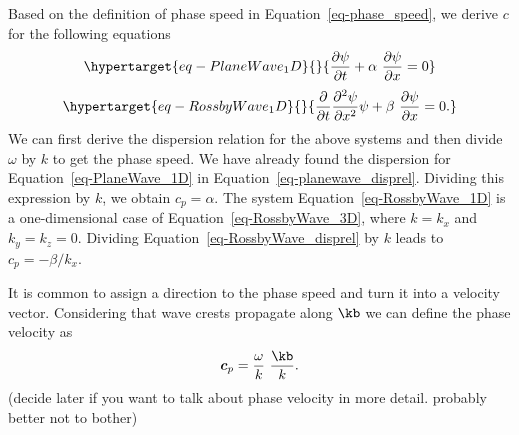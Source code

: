 \documentclass[
  letterpaper,
  twocolumn,
  landscape]{report}
\begin{document}
\begin{tcolorbox}[enhanced jigsaw, left=2mm, opacityback=0, coltitle=black, bottomtitle=1mm, title={Example}, toprule=.15mm, colbacktitle=quarto-callout-tip-color!10!white, breakable, arc=.35mm, titlerule=0mm, colback=white, toptitle=1mm, opacitybacktitle=0.6, rightrule=.15mm, bottomrule=.15mm, colframe=quarto-callout-tip-color-frame, leftrule=.75mm]

Based on the definition of phase speed in Equation~\ref{eq-phase_speed},
we derive \(c\) for the following equations
\begin{equation}\protect\hypertarget{eq-PlaneWave_1D}{}{  \frac{\partial \psi}{\partial t} + \alpha \ \frac{\partial \psi}{\partial x} = 0 }\label{eq-PlaneWave_1D}\end{equation}
\begin{equation}\protect\hypertarget{eq-RossbyWave_1D}{}{    \frac{\partial}{\partial t} \frac{\partial^2 \psi}{\partial x^2} \psi + \beta \ \frac{\partial \psi}{\partial x} = 0. }\label{eq-RossbyWave_1D}\end{equation}
We can first derive the dispersion relation for the above systems and
then divide \(\omega\) by \(k\) to get the phase speed. We have already
found the dispersion for Equation~\ref{eq-PlaneWave_1D} in
Equation~\ref{eq-planewave_disprel}. Dividing this expression by \(k\),
we obtain \(c_p = \alpha\). The system Equation~\ref{eq-RossbyWave_1D}
is a one-dimensional case of Equation~\ref{eq-RossbyWave_3D}, where
\(k = k_x\) and \(k_y = k_z =0\). Dividing
Equation~\ref{eq-RossbyWave_disprel} by \(k\) leads to
\(c_p = -\beta / k_x\).

\end{tcolorbox}

It is common to assign a direction to the phase speed and turn it into a
velocity vector. Considering that wave crests propagate along \(\kb\) we
can define the phase velocity as \[
    \boldsymbol{c}_p = \frac{\omega}{k} \ \frac{\kb}{k}.
\] (decide later if you want to talk about phase velocity in more
detail. probably better not to bother)
\end{document}

